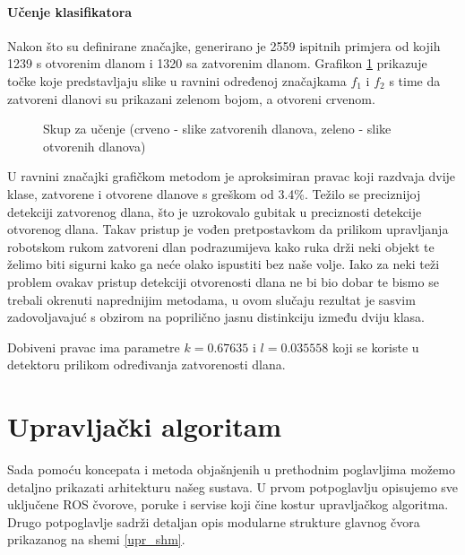 \documentclass[times, utf8, diplomski, numeric]{fer}
\begin{document}
\subsubsection{Učenje klasifikatora}
Nakon što su definirane značajke, generirano je 2559 ispitnih primjera od kojih 1239 s otvorenim dlanom i 1320 sa zatvorenim dlanom. Grafikon \ref{scatter_graph_lbl} prikazuje točke koje predstavljaju slike u ravnini određenoj značajkama $f_{1}$ i $f_{2}$ s time da zatvoreni dlanovi su prikazani zelenom bojom, a otvoreni crvenom.

\begin{figure}[h]
\label{scatter_graph_lbl}
\centering

\renewcommand{\figurename}{Grafikon}
	\caption{Skup za učenje (crveno - slike zatvorenih dlanova, zeleno - slike otvorenih dlanova)}
\end{figure}

U ravnini značajki grafičkom metodom je aproksimiran pravac koji razdvaja dvije klase, zatvorene i otvorene dlanove s greškom od 3.4\%. Težilo se preciznijoj detekciji zatvorenog dlana, što je uzrokovalo gubitak u preciznosti detekcije otvorenog dlana. Takav pristup je vođen pretpostavkom da prilikom upravljanja robotskom rukom zatvoreni dlan podrazumijeva kako ruka drži neki objekt te želimo biti sigurni kako ga neće olako ispustiti bez naše volje. Iako za neki teži problem ovakav pristup detekciji otvorenosti dlana ne bi bio dobar te bismo se trebali okrenuti naprednijim metodama, u ovom slučaju rezultat je sasvim zadovoljavajuć s obzirom na poprilično jasnu distinkciju između dviju klasa.

Dobiveni pravac ima parametre $k = 0.67635$ i $l=0.035558$ koji se koriste u detektoru prilikom određivanja zatvorenosti dlana.


\chapter{Upravljački algoritam}\label{Upravljački algoritam}
Sada pomoću koncepata i metoda objašnjenih u prethodnim poglavljima možemo detaljno prikazati arhitekturu našeg sustava.
U prvom potpoglavlju opisujemo sve uključene ROS čvorove, poruke i servise koji čine kostur upravljačkog algoritma.
Drugo potpoglavlje sadrži detaljan opis modularne strukture glavnog čvora prikazanog na shemi \ref{upr_shm}.
\end{document}
